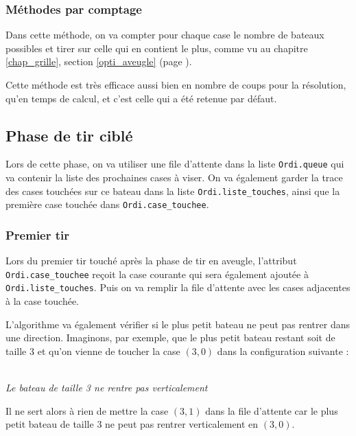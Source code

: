 \subsubsection{Méthodes par comptage}
Dans cette méthode, on va compter pour chaque case le nombre de bateaux possibles et tirer sur celle qui en contient le plus, comme vu au chapitre \ref{chap_grille}, section \ref{opti_aveugle} (page \pageref{opti_aveugle}).

Cette méthode est très efficace aussi bien en nombre de coups pour la résolution, qu'en temps de calcul, et c'est celle qui a été retenue par défaut. 

\subsection{Phase de tir ciblé}
Lors de cette phase, on va utiliser une file d'attente dans la liste \texttt{Ordi.queue} qui va contenir la liste des prochaines cases à viser. On va également garder la trace des cases touchées sur ce bateau dans la liste \texttt{Ordi.liste\_touches}, ainsi que la première case touchée dans \texttt{Ordi.case\_touchee}.
\subsubsection{Premier tir}
Lors du premier tir touché après la phase de tir en aveugle, l'attribut \texttt{Ordi.case\_touchee} reçoit la case courante qui sera également ajoutée à \texttt{Ordi.liste\_touches}. Puis on va remplir la file d'attente avec les cases adjacentes à la case touchée.

L'algorithme va également vérifier si le plus petit bateau ne peut pas rentrer dans une direction. Imaginons, par exemple, que le plus petit bateau restant soit de taille 3 et qu'on vienne de toucher la case $(3,0)$ dans la configuration suivante :

\begin{center}
\\
\textit{Le bateau de taille 3 ne rentre pas verticalement}
\end{center}
Il ne sert alors à rien de mettre la case $(3,1)$ dans la file d'attente car le plus petit bateau de taille 3 ne peut pas rentrer verticalement en $(3,0)$.

